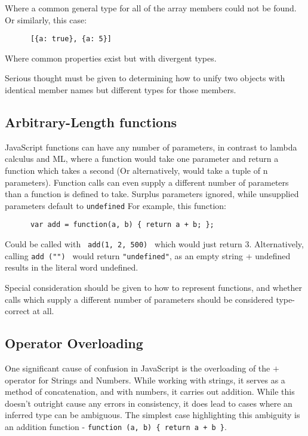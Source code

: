 \documentclass[british, twoside, openright]{bhamthesis}
\theoremstyle{definition}
\begin{document}
    Where a common general type for all of the array members could not be found. Or similarly, this case:

    \begin{lstlisting}
      [{a: true}, {a: 5}]
    \end{lstlisting}

    Where common properties exist but with divergent types.

    Serious thought must be given to determining how to unify two objects with identical member names but different types for those members.

  \subsection{Arbitrary-Length functions}
    JavaScript functions can have any number of parameters, in contrast to lambda calculus and ML, where a function would take one parameter and return a function which takes a second (Or alternatively, would take a tuple of n parameters). Function calls can even supply a different number of parameters than a function is defined to take. Surplus parameters ignored, while unsupplied parameters default to \texttt {undefined} For example, this function:

    \begin{lstlisting}
      var add = function(a, b) { return a + b; };
    \end{lstlisting}

    Could be called with \texttt { add(1, 2, 500) } which would just return 3. Alternatively, calling \texttt {add ("") } would return \texttt {"undefined"}, as an empty string + undefined results in the literal word undefined.

    Special consideration should be given to how to represent functions, and whether calls which supply a different number of parameters should be considered type-correct at all.

  \subsection{Operator Overloading}
    One significant cause of confusion in JavaScript is the overloading of the $+$ operator for Strings and Numbers. While working with strings, it serves as a method of concatenation, and with numbers, it carries out addition. While this doesn't outright cause any errors in consistency, it does lead to cases where an inferred type can be ambiguous. The simplest case highlighting this ambiguity is an addition function - \texttt {function (a, b) \{ return a + b \}}.
\end{document}
